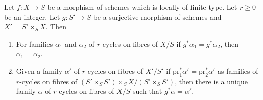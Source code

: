 \begin{lemma}
\label{lemma-descend-family}
Let $f : X \to S$ be a morphism of schemes which is locally of finite type.
Let $r \geq 0$ be an integer. Let $g : S' \to S$ be a surjective morphism of
schemes and $X' = S' \times_S X$. Then
\begin{enumerate}
\item For families $\alpha_1$ and $\alpha_2$ of $r$-cycles on fibres of $X/S$
if $g^*\alpha_1 = g^*\alpha_2$, then $\alpha_1 = \alpha_2$.
\item Given a family $\alpha'$ of $r$-cycles on fibres of $X'/S'$ if
$\text{pr}_1^*\alpha' = \text{pr}_2^*\alpha'$ as families of
$r$-cycles on fibres of $(S' \times_S S') \times_S X / (S' \times_S S')$,
then there is a unique family $\alpha$ of $r$-cycles on fibres of $X/S$
such that $g^*\alpha = \alpha'$.
\end{enumerate}
\end{lemma}

